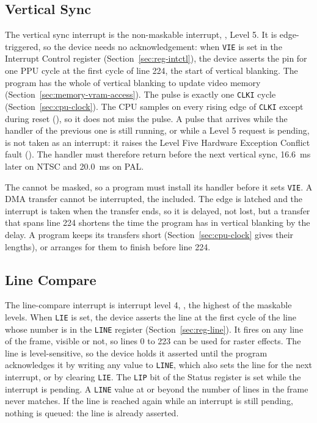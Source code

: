 \subsection{Vertical Sync}

The vertical sync interrupt is the non-maskable interrupt, , Level 5. It is edge-triggered, so the
device needs no acknowledgement: when \texttt{VIE} is set in the Interrupt Control register
(Section~\ref{sec:reg-intctl}), the device asserts the  pin for one PPU cycle at the first cycle of line
224, the start of vertical blanking. The program has the whole of vertical blanking to update video memory
(Section~\ref{sec:memory-vram-access}). The pulse is exactly one \texttt{CLKI} cycle (Section~\ref{sec:cpu-clock}). The
CPU samples  on every rising edge of \texttt{CLKI} except during reset (\hwmanual{}), so it does not
miss the pulse. A pulse that arrives while the handler of the previous one is still running, or while a Level 5 request
is pending, is not taken as an interrupt: it raises the Level Five Hardware Exception Conflict fault (\archmanual{}).
The handler must therefore return before the next vertical sync, 16.6~ms later on NTSC and 20.0~ms on PAL.

The  cannot be masked, so a program must install its handler before it sets \texttt{VIE}. A DMA transfer
cannot be interrupted, the  included. The edge is latched and the interrupt is taken when the transfer
ends, so it is delayed, not lost, but a transfer that spans line 224 shortens the time the program has in vertical
blanking by the delay. A program keeps its transfers short (Section~\ref{sec:cpu-clock} gives their lengths), or
arranges for them to finish before line 224.

\subsection{Line Compare}
\label{sec:line-interrupt}

The line-compare interrupt is interrupt level 4, , the highest of the maskable levels. When
\texttt{LIE} is set, the device asserts the line at the first cycle of the line whose number is in the \texttt{LINE}
register (Section~\ref{sec:reg-line}). It fires on any line of the frame, visible or not, so lines 0 to 223 can be used
for raster effects. The  line is level-sensitive, so the device holds it asserted until the program
acknowledges it by writing any value to \texttt{LINE}, which also sets the line for the next interrupt, or by clearing
\texttt{LIE}. The \texttt{LIP} bit of the Status register is set while the interrupt is pending. A \texttt{LINE} value
at or beyond the number of lines in the frame never matches. If the line is reached again while an interrupt is still
pending, nothing is queued: the line is already asserted.

